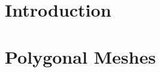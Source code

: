 \documentclass[10pt]{beamer}
\title{\presentationtitle}
\subtitle{Advanced Programming for Scientific Computing}
\author[Andrea Di Antonio]{Andrea Di Antonio \\ Supervised by Professors Paola F. Antonietti and Marco Verani} %
\date{Exam session of September 10, 2024 \\ Academic Year 2023-24}
\begin{document}
    \begin{frame}
        \titlepage
    \end{frame} %

    \section{Introduction}
    

	\section{Polygonal Meshes}
	

	
\end{document}
